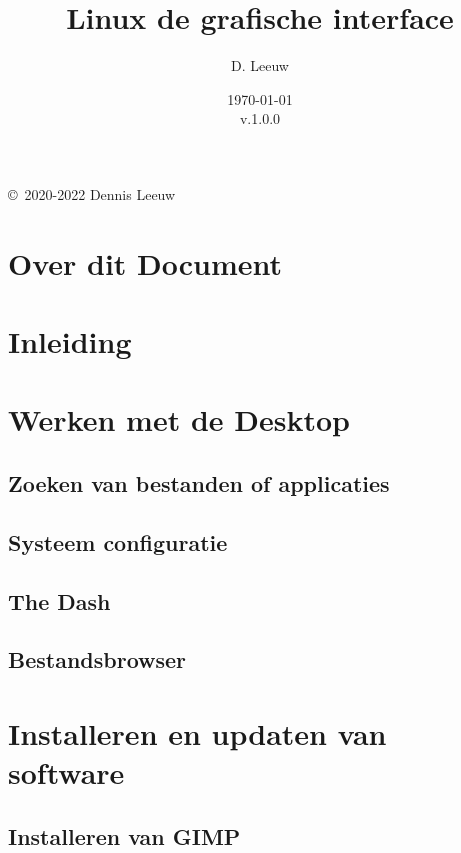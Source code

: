 \documentclass[a4paper,12pt,twoside,openright,titlepage]{book}
\author{D. Leeuw}
\title{Linux de grafische interface}
\date{\today\\v.1.0.0}
\begin{document}

\maketitle

\copyright\ 2020-2022 Dennis Leeuw\\




\frontmatter
\chapter{Over dit Document}



\tableofcontents

\mainmatter
\chapter{Inleiding}



\chapter{Werken met de Desktop}

\section{Zoeken van bestanden of applicaties}

\section{Systeem configuratie}

\section{The Dash}

\section{Bestandsbrowser}


\chapter{Installeren en updaten van software}

\section{Installeren van GIMP}

\end{document}
